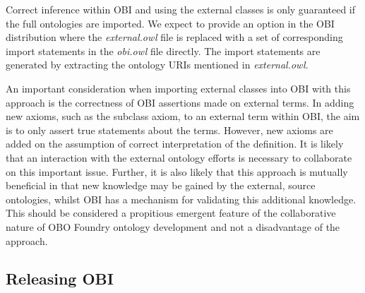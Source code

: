 \documentclass{elsart}       %
\begin{document}
Correct inference within OBI and using the external classes is only guaranteed if the full ontologies are imported.
We expect to provide an option in the OBI distribution where the \emph{external.owl} file is replaced with a set of corresponding import statements in the \textit{obi.owl} file directly. 
The import statements are generated by extracting the ontology URIs mentioned in \emph{external.owl}. 

An important consideration when importing external classes into OBI with this approach is the correctness of OBI assertions made on external terms.
In adding new axioms, such as the subclass axiom, to an external term within OBI, the aim is to only assert true statements about the terms.
However, new axioms are added on the assumption of correct interpretation of the definition.
It is likely that an interaction with the external ontology efforts is necessary to collaborate on this important issue. Further, it is also likely that this approach is mutually beneficial in that new knowledge may be gained by the external, source ontologies, whilst OBI has a mechanism for validating this additional knowledge. This should be considered a propitious emergent feature of the collaborative nature of OBO Foundry ontology development and not a disadvantage of the approach.

\subsection{Releasing OBI}
\end{document}
